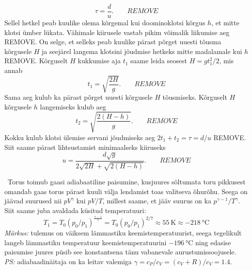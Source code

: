 \documentclass[10pt]{article}
\newcommand{\p}[1]{REMOVE}
\begin{document}
\solu
\begin{equation*}
\tau=\frac{d}{u}. \qquad \p1
\end{equation*}
Sellel hetkel peab kuulike olema kõrgemal kui doominoklotsi kõrgus $h$, et mitte klotsi ümber lükata. Vähimale kiirusele vastab pikim võimalik liikumise aeg \p1. On selge, et selleks peab kuulike pärast põrget uuesti tõusma kõrgusele $H$ ja seejärel langema klotsini jõudmise hetkeks mitte madalamale kui $h$ \p1. Kõrguselt $H$ kukkumise aja $t_1$ saame leida seosest $H=gt_1^2/2$, mis annab
\begin{equation*}
t_1=\sqrt{\frac{2H}{g}}. \qquad \p1
\end{equation*}
Sama aeg kulub ka pärast põrget uuesti kõrgusele $H$ tõusmiseks. Kõrguselt $H$ kõrgusele $h$ langemiseks kulub aeg
\begin{equation*}
t_2=\sqrt{\frac{2(H-h)}{g}}. \qquad \p1
\end{equation*}
Kokku kulub klotsi ülemise servani jõudmiseks aeg $2t_1+t_2=\tau=d/u$ \p1. Siit saame pärast lihtsustamist minimaalseks kiiruseks
\begin{equation*}
  u=\frac{d\sqrt{g}}{2\sqrt{2H}+\sqrt{2(H-h)}}. \qquad \p1
\end{equation*}
\probend
\bigskip


\solu
\
Torus toimub gaasi adiabaatiline paisumine, kusjuures sõltumata toru pikkusest omandab gaas torus pärast kuuli välja lendamist toas valitseva õhurõhu. Seega on jäävad suurused nii $pV^\gamma$ kui $pV/T$, millest saame, et jääv suurus on ka $p^{\gamma-1}/T^\gamma$. Siit saame juba avaldada küsitud temperatuuri:
$$
T_1=T_0(p_0/p_1)^{\frac{\gamma - 1}{\gamma}}=T_0(p_0/p_1)^{2/7} \approx \SI{55}{\kelvin} \approx \SI{-218}{\celsius}
$$
\textit{Märkus:} tulemus on väiksem lämmastiku keemistemperatuurist, seega tegelikult langeb lämmastiku temperatuur keemistemperatuurini $\SI{-196}{\celsius}$ ning edasise paisumise juures püsib see konstantsena tänu vabanevale aurustumissoojusele.
\textit{PS:} adiabaadinäitaja on ka leitav valemiga $\gamma=c_P/c_V=(c_V+R)/c_V=1.4$.
\probend
\bigskip

\end{document}
